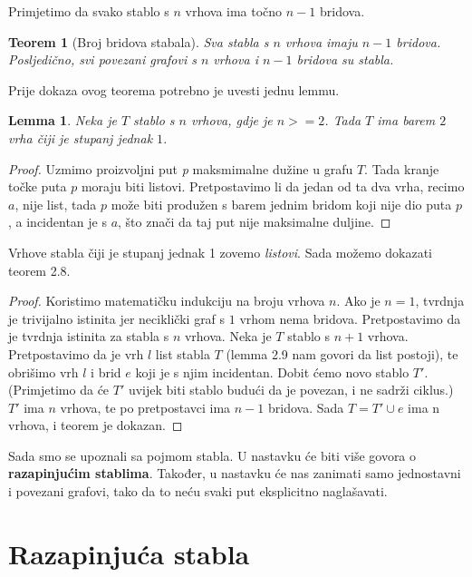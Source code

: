 \documentclass[times, utf8, zavrsni]{fer}
\newtheorem{theorem}{Teorem}[section]
\newtheorem{lemma}{Lemma}[section]
\begin{document}
Primjetimo da svako stablo s $n$ vrhova ima točno $n - 1$ bridova.

\begin{theorem}[Broj bridova stabala]
	Sva stabla s $n$ vrhova imaju $n-1$ bridova. Posljedično, svi povezani grafovi s $n$ vrhova i $n-1$ bridova su stabla.
\end{theorem}

Prije dokaza ovog teorema potrebno je uvesti jednu lemmu.

\begin{lemma}
	Neka je $T$ stablo s $n$ vrhova, gdje je $n >= 2$. Tada $T$ ima barem $2$ vrha čiji je stupanj jednak $1$.
\end{lemma}

\begin{proof}
	Uzmimo proizvoljni put \textit{p} maksmimalne dužine u grafu $T$. Tada kranje točke puta $p$ moraju biti listovi. Pretpostavimo li da jedan od ta dva vrha, recimo $a$, nije list, tada $p$ može biti produžen s barem jednim bridom koji nije dio puta $p$, a incidentan je s $a$, što znači da taj put nije maksimalne duljine.
\end{proof}

Vrhove stabla čiji je stupanj jednak 1 zovemo \textit{listovi}. Sada možemo dokazati teorem 2.8.

\begin{proof}
	Koristimo matematičku indukciju na broju vrhova $n$. Ako je $n = 1$, tvrdnja je trivijalno istinita jer neciklički graf s $1$ vrhom nema bridova. Pretpostavimo da je tvrdnja istinita za stabla s $n$ vrhova. Neka je $T$ stablo s $n + 1$ vrhova. Pretpostavimo da je vrh $l$ list stabla $T$ (lemma 2.9 nam govori da list postoji), te obrišimo vrh $l$ i brid $e$ koji je s njim incidentan. Dobit ćemo novo stablo $T'$. (Primjetimo da će $T'$ uvijek biti stablo budući da je povezan, i ne sadrži ciklus.) $T'$ ima $n$ vrhova, te po pretpostavci ima $n-1$ bridova. Sada $T = T' \cup e$ ima n vrhova, i teorem je dokazan.
\end{proof} 

Sada smo se upoznali sa pojmom stabla. U nastavku će biti više govora o \textbf{razapinjućim stablima}. Također, u nastavku će nas zanimati samo jednostavni i povezani grafovi, tako da to neću svaki put eksplicitno naglašavati.

\chapter{Razapinjuća stabla}
\end{document}
